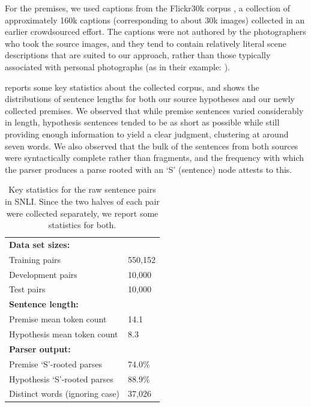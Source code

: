 For the premises, we used captions from the Flickr30k corpus \cite{hodoshimage}, a collection of approximately 160k captions (corresponding to about 30k images) collected in an earlier crowdsourced effort. The captions were not authored by the photographers who took the source images, and they tend to contain relatively literal scene descriptions that are suited to our approach, rather than those typically associated with personal photographs (as in their example: ).

 reports some key statistics about the collected corpus, and  shows the distributions of sentence lengths for both our source hypotheses and our newly collected premises. We observed that while premise sentences varied considerably in length, hypothesis sentences tended to be as short as possible while still providing enough information to yield a clear judgment, clustering at around seven words. We also observed that the bulk of the sentences from both sources were syntactically complete rather than fragments, and the frequency with which the parser produces a parse rooted with an `S' (sentence) node attests to this.

\begin{table}
\center
  \begin{tabular}{l l} 
    \toprule
\multicolumn{2}{l}{\textbf{Data set sizes:}}\\
Training pairs &  550,152\\
Development pairs &  10,000\\
Test pairs & 10,000\\
\midrule
\multicolumn{2}{l}{\textbf{Sentence length:}}\\
Premise mean token count & 14.1\\
Hypothesis mean token count & 8.3 \\
\midrule
\multicolumn{2}{l}{\textbf{Parser output:}}\\
Premise `S'-rooted parses & 74.0\%\\
Hypothesis `S'-rooted parses & 88.9\%\\
Distinct words (ignoring case) & 37,026\\
    \bottomrule
  \end{tabular}
\caption{\label{collection-stats}Key statistics for the raw sentence pairs in SNLI. Since the two halves of each pair were collected separately, we report some statistics for both.} 
\end{table}


